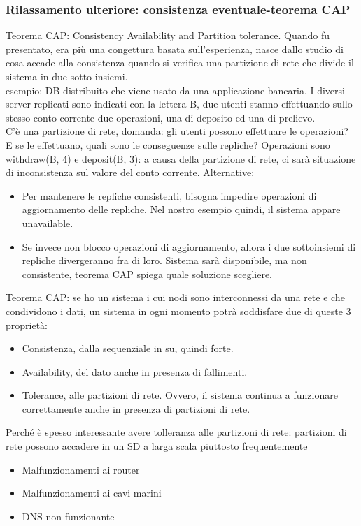 \documentclass{article}
\begin{document}
\subsubsection{Rilassamento ulteriore: consistenza eventuale-teorema CAP}
Teorema CAP: Consistency Availability and Partition tolerance. Quando fu presentato, era più una congettura basata sull'esperienza, nasce dallo studio di cosa accade alla consistenza quando si verifica una partizione di rete che divide il sistema in due sotto-insiemi.\\ esempio: DB distribuito che viene usato da una applicazione bancaria. I diversi server replicati sono indicati con la lettera B, due utenti stanno effettuando sullo stesso conto corrente due operazioni, una di deposito ed una di prelievo.\\ C'è una partizione di rete, domanda: gli utenti possono effettuare le operazioni? E se le effettuano, quali sono le conseguenze sulle repliche? Operazioni sono withdraw(B, 4) e deposit(B, 3): a causa della partizione di rete, ci sarà situazione di inconsistenza sul valore del conto corrente. Alternative:
\begin{itemize}
\item Per mantenere le repliche consistenti, bisogna impedire operazioni di aggiornamento delle repliche. Nel nostro esempio quindi, il sistema appare unavailable. 
\item Se  invece non blocco operazioni di aggiornamento, allora i due sottoinsiemi di repliche divergeranno fra di loro. Sistema sarà disponibile, ma non consistente, teorema CAP spiega quale soluzione scegliere.
\end{itemize}
Teorema CAP: se ho un sistema i cui nodi sono interconnessi da una rete e che condividono i dati, un sistema in ogni momento potrà soddisfare due di queste 3 proprietà:
\begin{itemize}
\item Consistenza, dalla sequenziale in su, quindi forte.
\item Availability, del dato anche in presenza di fallimenti.
\item Tolerance, alle partizioni di rete. Ovvero, il sistema continua a funzionare correttamente anche in presenza di partizioni di rete.
\end{itemize}
Perché è spesso interessante avere tolleranza alle partizioni di rete: partizioni di rete possono accadere in un SD a larga scala piuttosto frequentemente
\begin{itemize}
\item Malfunzionamenti ai router 
\item Malfunzionamenti ai cavi marini
\item DNS non funzionante
\end{itemize}
\end{document}
